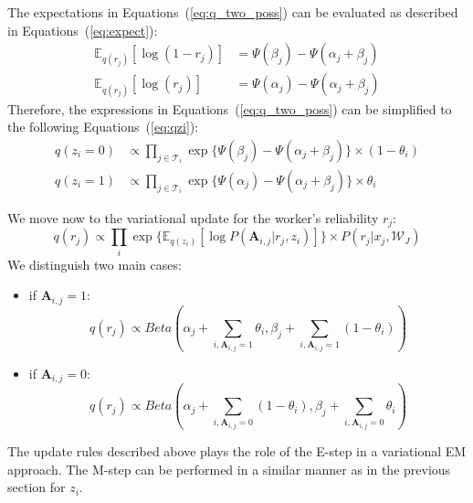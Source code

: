 The expectations in Equations~(\ref{eq:q_two_poss}) can be evaluated as described in Equations~(\ref{eq:expect}):
\begin{align}
    \mathbb{E}_{q(r_j)}[\log (1-r_j)]&= \Psi(\beta_j)-\Psi(\alpha_j+\beta_j) \nonumber \\
    \mathbb{E}_{q(r_j)}[\log (r_j)]&= \Psi(\alpha_j)-\Psi(\alpha_j+\beta_j)
    \label{eq:expect}
\end{align}
Therefore, the expressions in Equations~(\ref{eq:q_two_poss}) can be simplified to the following Equations~(\ref{eq:qzi}):
\begin{align}
    q(z_i=0)   &\propto \prod_{j \in \mathcal{T}_{i}} \exp{\{\Psi(\beta_j)-\Psi(\alpha_j+\beta_j)\}}\times (1-\theta_i) \nonumber \\  
     q(z_i=1)    &\propto \prod_{j \in \mathcal{T}_{i}} \exp{\{ \Psi(\alpha_j)-\Psi(\alpha_j+\beta_j)\}}\times \theta_i  
     \label{eq:qzi}
\end{align}

We move now to the variational update for the worker's reliability $r_j$:
\begin{equation}
    q(r_j) \propto \prod_{i} \exp{\{\mathbb{E}_{q(z_i)}[\log{P(\mathbf{A}_{i,j}|r_j,z_i)}]\}} \times   {P(r_j|x_j,\mathcal{W}_J)}
\end{equation}
We distinguish two main cases:
\begin{itemize}
\item if $\mathbf{A}_{i,j}=1$:
\begin{equation}
  q(r_j)  \propto Beta(\alpha_j+\sum_{i,\mathbf{A}_{i,j}=1}  \theta_i,\beta_j+ \sum_{i,\mathbf{A}_{i,j}=1} (1 - \theta_i) )
  \label{eq:rj_aij_1}
\end{equation}
\item if $\mathbf{A}_{i,j}=0$:
\begin{equation}
 q(r_j)  \propto Beta(\alpha_j+\sum_{i,\mathbf{A}_{i,j}=0} (1 - \theta_i),\beta_j+ \sum_{i,\mathbf{A}_{i,j}=0} \theta_i)
   \label{eq:rj_aij_0}
\end{equation}
\end{itemize}
The update rules described above plays the role of the E-step in a variational EM approach. 
The M-step can be performed in a similar manner as in the previous section for $z_i$.
